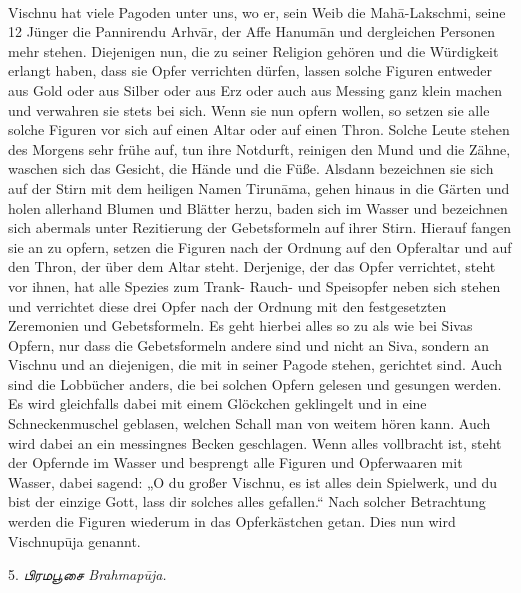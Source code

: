 \documentclass{article}
\newcommand{\TamilText}[1]{\texttamil{#1}}
\newcommand{\tam}[1]{\TamilText{#1}}
\begin{document}
\paragraph{}
Vischnu hat viele Pagoden unter uns, wo er, sein Weib die Mah\={a}-Lakschmi, seine 12 Jünger die Pannirendu Arhv\={a}r, der Affe Hanum\={a}n und dergleichen Personen mehr stehen. Diejenigen nun, die zu seiner Religion gehören und die Würdigkeit erlangt haben, dass sie Opfer verrichten dürfen, lassen solche Figuren entweder aus Gold oder aus Silber oder aus Erz oder auch aus Messing ganz klein machen und verwahren sie stets bei sich. Wenn sie nun opfern wollen, so setzen sie alle solche Figuren vor sich auf einen Altar oder auf einen Thron. Solche Leute stehen des Morgens sehr frühe auf, tun ihre Notdurft, reinigen den Mund und die Zähne, waschen sich das Gesicht, die Hände und die Füße. Alsdann bezeichnen sie sich auf der Stirn mit dem heiligen Namen Tirun\={a}ma, gehen hinaus in die Gärten und holen allerhand Blumen und Blätter herzu, baden sich im Wasser und bezeichnen sich abermals unter Rezitierung der Gebetsformeln auf ihrer Stirn. Hierauf fangen sie an zu opfern, setzen die Figuren nach der Ordnung auf den Opferaltar und auf den Thron, der über dem Altar steht. Derjenige, der das Opfer verrichtet, steht vor ihnen, hat alle Spezies zum Trank- Rauch- und Speisopfer neben sich stehen und verrichtet diese drei Opfer nach der Ordnung mit den festgesetzten Zeremonien und Gebetsformeln. Es geht hierbei alles so zu als wie bei Sivas Opfern, nur dass die Gebetsformeln andere sind und nicht an Siva, sondern an Vischnu und an diejenigen, die mit in seiner Pagode stehen, gerichtet sind. Auch sind die Lobbücher anders, die bei solchen Opfern gelesen und gesungen werden. Es wird gleichfalls dabei mit einem Glöckchen geklingelt und in eine Schneckenmuschel geblasen, welchen Schall man von weitem hören kann. Auch wird dabei an ein messingnes Becken geschlagen. Wenn alles vollbracht ist, steht der Opfernde im Wasser und besprengt alle Figuren und Opferwaaren mit Wasser, dabei sagend: „O du großer Vischnu, es ist alles dein Spielwerk, und du bist der einzige Gott, lass dir solches alles gefallen.“ Nach solcher Betrachtung werden die Figuren wiederum in das Opferkästchen getan. Dies nun wird Vischnup\={u}ja genannt.

\begin{center}
5. \emph{\tam{பிரமபூசை} Brahmap\={u}ja.}
\end{center}
\end{document}
